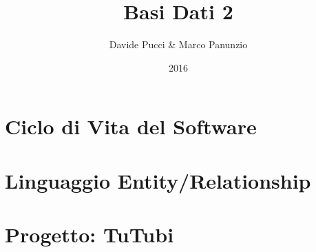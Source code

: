 

\title{Basi Dati 2}
\author{Davide Pucci \& Marco Panunzio}
\date{2016}

\maketitle

\tableofcontents

\chapter{Ciclo di Vita del Software}


\chapter{Linguaggio Entity/Relationship}


\chapter{Progetto: TuTubi}


